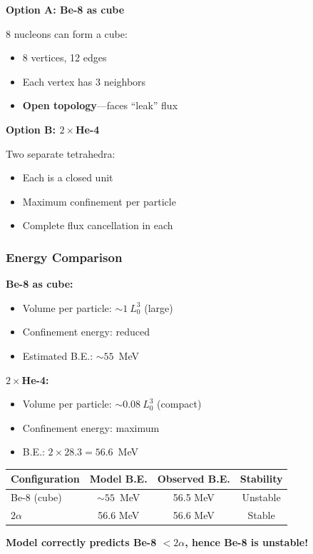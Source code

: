 \textbf{Option A: Be-8 as cube}

8 nucleons can form a cube:
\begin{itemize}
    \item 8 vertices, 12 edges
    \item Each vertex has 3 neighbors
    \item \textbf{Open topology}—faces ``leak'' flux
\end{itemize}

\textbf{Option B: $2 \times$He-4}

Two separate tetrahedra:
\begin{itemize}
    \item Each is a closed unit
    \item Maximum confinement per particle
    \item Complete flux cancellation in each
\end{itemize}

\subsubsection{Energy Comparison}

\textbf{Be-8 as cube:}
\begin{itemize}
    \item Volume per particle: $\sim 1~L_0^3$ (large)
    \item Confinement energy: reduced
    \item Estimated B.E.: $\sim 55$~MeV
\end{itemize}

\textbf{$2 \times$He-4:}
\begin{itemize}
    \item Volume per particle: $\sim 0.08~L_0^3$ (compact)
    \item Confinement energy: maximum
    \item B.E.: $2 \times 28.3 = 56.6$~MeV
\end{itemize}

\begin{tcolorbox}[colback=green!5!white, colframe=green!75!black, title=Result: Be-8 Instability Predicted]
\begin{center}
\begin{tabular}{lccc}
\hline
Configuration & Model B.E. & Observed B.E. & Stability \\
\hline
Be-8 (cube) & $\sim 55$~MeV & 56.5 MeV & Unstable \\
$2\alpha$ & 56.6 MeV & 56.6 MeV & Stable \\
\hline
\end{tabular}
\end{center}
\textbf{Model correctly predicts Be-8 $< 2\alpha$, hence Be-8 is unstable!}
\end{tcolorbox}

